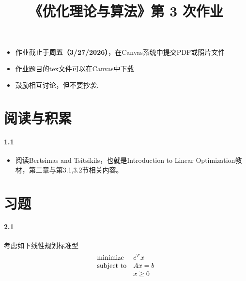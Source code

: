 \documentclass[12pt,a4paper]{article}
\begin{document}
\title{
{《优化理论与算法》第 3 次作业
}

}
\date{}


\maketitle

\begin{itemize}
	\item 作业截止于{\bf 周五（3/27/2026）}，在Canvas系统中提交PDF或照片文件
	\item 作业题目的tex文件可以在Canvas中下载
	\item 鼓励相互讨论，但不要抄袭.
\end{itemize}

\section{阅读与积累}
\paragraph{1.1}
\begin{itemize}
	\item 阅读Bertsimas and Tsitsikils，也就是Introduction to Linear Optimization教材，第二章与第3.1,3.2节相关内容。
\end{itemize}

\section{习题}


\paragraph{2.1}
考虑如下线性规划标准型
\begin{equation*}
\begin{array}{lllll@{}ll}
\text{minimize}  & c^Tx\\
\text{subject to}&Ax=b \\
&x \geq 0
\end{array}
\end{equation*}
\end{document}

